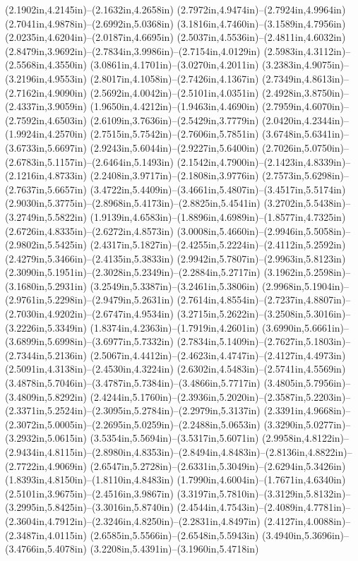 (2.1902in,4.2145in)--(2.1632in,4.2658in) (2.7972in,4.9474in)--(2.7924in,4.9964in) (2.7041in,4.9878in)--(2.6992in,5.0368in) (3.1816in,4.7460in)--(3.1589in,4.7956in) (2.0235in,4.6204in)--(2.0187in,4.6695in) (2.5037in,4.5536in)--(2.4811in,4.6032in) (2.8479in,3.9692in)--(2.7834in,3.9986in)--(2.7154in,4.0129in) (2.5983in,4.3112in)--(2.5568in,4.3550in) (3.0861in,4.1701in)--(3.0270in,4.2011in) (3.2383in,4.9075in)--(3.2196in,4.9553in) (2.8017in,4.1058in)--(2.7426in,4.1367in) (2.7349in,4.8613in)--(2.7162in,4.9090in) (2.5692in,4.0042in)--(2.5101in,4.0351in) (2.4928in,3.8750in)--(2.4337in,3.9059in) (1.9650in,4.4212in)--(1.9463in,4.4690in) (2.7959in,4.6070in)--(2.7592in,4.6503in) (2.6109in,3.7636in)--(2.5429in,3.7779in) (2.0420in,4.2344in)--(1.9924in,4.2570in) (2.7515in,5.7542in)--(2.7606in,5.7851in) (3.6748in,5.6341in)--(3.6733in,5.6697in) (2.9243in,5.6044in)--(2.9227in,5.6400in) (2.7026in,5.0750in)--(2.6783in,5.1157in)--(2.6464in,5.1493in) (2.1542in,4.7900in)--(2.1423in,4.8339in)--(2.1216in,4.8733in) (2.2408in,3.9717in)--(2.1808in,3.9776in) (2.7573in,5.6298in)--(2.7637in,5.6657in) (3.4722in,5.4409in)--(3.4661in,5.4807in)--(3.4517in,5.5174in) (2.9030in,5.3775in)--(2.8968in,5.4173in)--(2.8825in,5.4541in) (3.2702in,5.5438in)--(3.2749in,5.5822in) (1.9139in,4.6583in)--(1.8896in,4.6989in)--(1.8577in,4.7325in) (2.6726in,4.8335in)--(2.6272in,4.8573in) (3.0008in,5.4660in)--(2.9946in,5.5058in)--(2.9802in,5.5425in) (2.4317in,5.1827in)--(2.4255in,5.2224in)--(2.4112in,5.2592in) (2.4279in,5.3466in)--(2.4135in,5.3833in) (2.9942in,5.7807in)--(2.9963in,5.8123in) (2.3090in,5.1951in)--(2.3028in,5.2349in)--(2.2884in,5.2717in) (3.1962in,5.2598in)--(3.1680in,5.2931in) (3.2549in,5.3387in)--(3.2461in,5.3806in) (2.9968in,5.1904in)--(2.9761in,5.2298in)--(2.9479in,5.2631in) (2.7614in,4.8554in)--(2.7237in,4.8807in)--(2.7030in,4.9202in)--(2.6747in,4.9534in) (3.2715in,5.2622in)--(3.2508in,5.3016in)--(3.2226in,5.3349in) (1.8374in,4.2363in)--(1.7919in,4.2601in) (3.6990in,5.6661in)--(3.6899in,5.6998in)--(3.6977in,5.7332in) (2.7834in,5.1409in)--(2.7627in,5.1803in)--(2.7344in,5.2136in) (2.5067in,4.4412in)--(2.4623in,4.4747in)--(2.4127in,4.4973in) (2.5091in,4.3138in)--(2.4530in,4.3224in) (2.6302in,4.5483in)--(2.5741in,4.5569in) (3.4878in,5.7046in)--(3.4787in,5.7384in)--(3.4866in,5.7717in) (3.4805in,5.7956in)--(3.4809in,5.8292in) (2.4244in,5.1760in)--(2.3936in,5.2020in)--(2.3587in,5.2203in)--(2.3371in,5.2524in)--(2.3095in,5.2784in)--(2.2979in,5.3137in) (2.3391in,4.9668in)--(2.3072in,5.0005in)--(2.2695in,5.0259in)--(2.2488in,5.0653in) (3.3290in,5.0277in)--(3.2932in,5.0615in) (3.5354in,5.5694in)--(3.5317in,5.6071in) (2.9958in,4.8122in)--(2.9434in,4.8115in)--(2.8980in,4.8353in)--(2.8494in,4.8483in)--(2.8136in,4.8822in)--(2.7722in,4.9069in) (2.6547in,5.2728in)--(2.6331in,5.3049in)--(2.6294in,5.3426in) (1.8393in,4.8150in)--(1.8110in,4.8483in) (1.7990in,4.6004in)--(1.7671in,4.6340in) (2.5101in,3.9675in)--(2.4516in,3.9867in) (3.3197in,5.7810in)--(3.3129in,5.8132in)--(3.2995in,5.8425in)--(3.3016in,5.8740in) (2.4544in,4.7543in)--(2.4089in,4.7781in)--(2.3604in,4.7912in)--(2.3246in,4.8250in)--(2.2831in,4.8497in) (2.4127in,4.0088in)--(2.3487in,4.0115in) (2.6585in,5.5566in)--(2.6548in,5.5943in) (3.4940in,5.3696in)--(3.4766in,5.4078in) (3.2208in,5.4391in)--(3.1960in,5.4718in) 